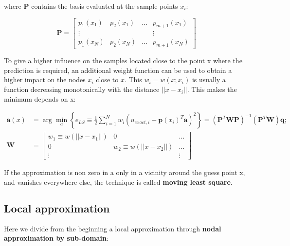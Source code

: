 	where $\bm{P}$ contains the basis evaluated at the sample points $x_i$: 
	
	\begin{equation}
	\bm{P} = \left[  
	\begin{array}{cccc}
	p_1(x_1) & p_2(x_1) & \dots & p_{m+1}(x_1)\\
	\vdots & & & \vdots \\
	p_1(x_N) & p_2(x_N) & \dots & p_{m+1}(x_N)
	\end{array}
	\right]
	\end{equation}
	
	To give a higher influence on the samples located close to the point x where the prediction is required, an additional weight function can be used to obtain a higher impact on the nodes $x_i$ close to $x$. This $w_i = w(x;x_i)$ is usually a function decreasing monotonically with the distance $||x-x_i||$. This makes the minimum depends on x: 
	
	\begin{equation}
	\begin{aligned}
	\bm{a}(x) &= \arg \min _a \left\{ e_{LS} \equiv \frac{1}{2}\sum _{i=1}^N w_i \left(u_{exact,i}-\bm{p}(x_i)^T\bm{a}\right)^2 \right\} = \left( \bm{P}^T\bm{W}\bm{P} \right)^{-1} (\bm{P}^T\bm{W}) \bm{q};\\
	\bm{W} &=
	\left[
	\begin{array}{ccc}
	w_1\equiv w(||x-x_1||) & 0 & \dots\\
	0 & w_2\equiv w(||x-x_2||) & \dots\\
	\vdots & & \vdots
	\end{array}
	\right]
	\end{aligned}
	\end{equation}
	
	If the approximation is non zero in a only in a vicinity around the guess point x, and vanishes everywhere else, the technique is called \textbf{moving least square}. 
	
\subsection{Local approximation}
	Here we divide from the beginning a local approximation through \textbf{nodal approximation by sub-domain}:
	
